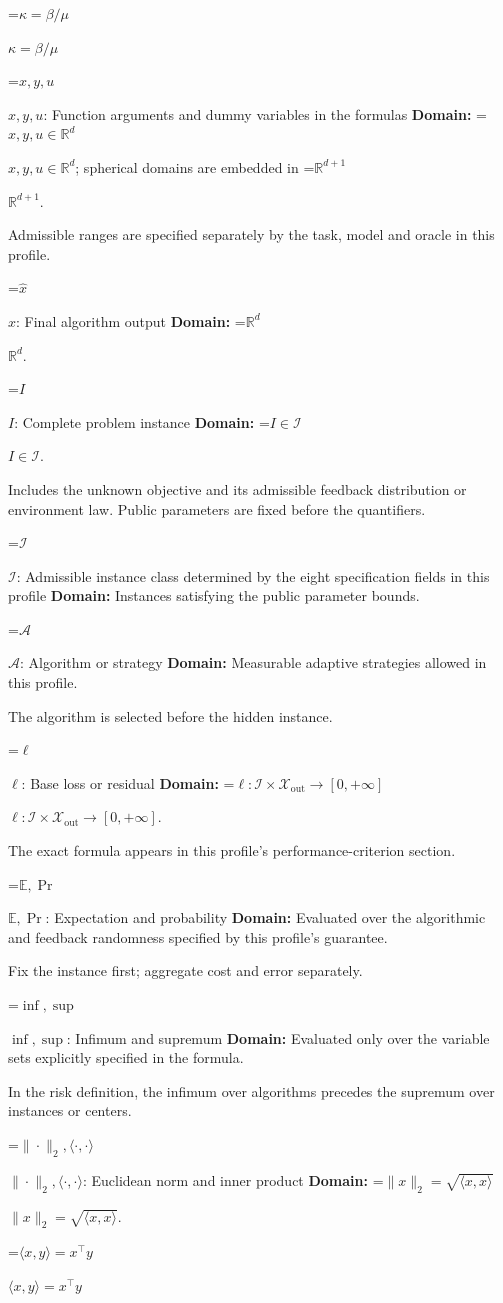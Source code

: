 \documentclass[10pt,a4paper]{article}
\newcommand{\AtlasMath}[1]{\par\begingroup\centering\setbox0=\hbox{$\displaystyle #1$}\ifdim\wd0>1.4\linewidth\typeout{ATLAS WIDE FORMULA: \the\wd0}\fi\ifdim\wd0>\linewidth\resizebox{\linewidth}{!}{\box0}\else\box0\fi\par\endgroup}
\newcommand{\AtlasInlineMath}[1]{\begingroup\setbox0=\hbox{$#1$}\ifdim\wd0>.4\linewidth\endgroup\AtlasMath{#1}\else\endgroup$#1$\fi}
\begin{document}
\AtlasInlineMath{\kappa=\beta/\mu}

\AtlasInlineMath{x,y,u}: Function arguments and dummy variables in the formulas \textbf{Domain:} \AtlasInlineMath{x,y,u\in\mathbb{R}^d}; spherical domains are embedded in \AtlasInlineMath{\mathbb{R}^{d+1}}.

Admissible ranges are specified separately by the task, model and oracle in this profile.

\AtlasInlineMath{\widehat{x}}: Final algorithm output \textbf{Domain:} \AtlasInlineMath{\mathbb{R}^d}.

\AtlasInlineMath{I}: Complete problem instance \textbf{Domain:} \AtlasInlineMath{I\in\mathcal{I}}.

Includes the unknown objective and its admissible feedback distribution or environment law. Public parameters are fixed before the quantifiers.

\AtlasInlineMath{\mathcal{I}}: Admissible instance class determined by the eight specification fields in this profile \textbf{Domain:} Instances satisfying the public parameter bounds.

\AtlasInlineMath{\mathcal{A}}: Algorithm or strategy \textbf{Domain:} Measurable adaptive strategies allowed in this profile.

The algorithm is selected before the hidden instance.

\AtlasInlineMath{\ell}: Base loss or residual \textbf{Domain:} \AtlasInlineMath{\ell:\mathcal{I}\times\mathcal{X}_{\mathrm{out}}\to[0,+\infty]}.

The exact formula appears in this profile's performance-criterion section.

\AtlasInlineMath{\mathbb{E},\Pr}: Expectation and probability \textbf{Domain:} Evaluated over the algorithmic and feedback randomness specified by this profile's guarantee.

Fix the instance first; aggregate cost and error separately.

\AtlasInlineMath{\inf,\sup}: Infimum and supremum \textbf{Domain:} Evaluated only over the variable sets explicitly specified in the formula.

In the risk definition, the infimum over algorithms precedes the supremum over instances or centers.

\AtlasInlineMath{\|\cdot\|_2,\langle\cdot,\cdot\rangle}: Euclidean norm and inner product \textbf{Domain:} \AtlasInlineMath{\|x\|_2=\sqrt{\langle x,x\rangle}}.

\AtlasInlineMath{\langle x,y\rangle=x^\top y}
\end{document}

